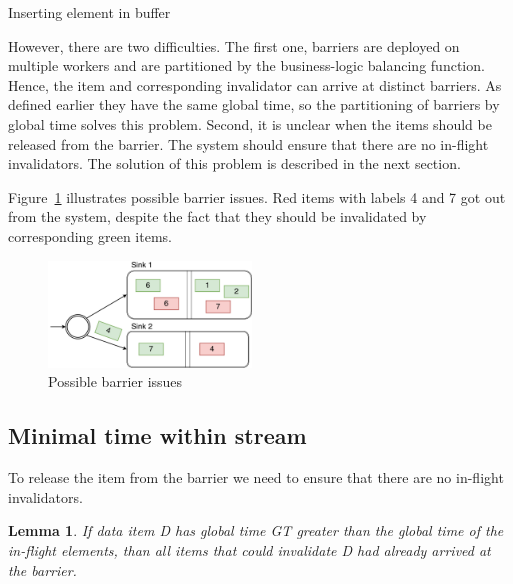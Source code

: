 \begin{algorithm}
\caption{Inserting element in buffer}
\label{buffer-insert}
\begin{algorithmic}
        \State {}
      \EndIf
    \EndFor
    \State {}
  \EndFunction
\end{algorithmic}
\end{algorithm}

However, there are two difficulties. The first one, barriers are deployed on multiple workers and are partitioned by the business-logic balancing function. Hence, the item and corresponding invalidator can arrive at distinct barriers. As defined earlier they have the same global time, so the partitioning of barriers by global time solves this problem. Second, it is unclear when the items should be released from the barrier. The system should ensure that there are no in-flight invalidators. The solution of this problem is described in the next section. 

Figure~\ref{invalidation-problems-figure} illustrates possible barrier issues. Red items with labels 4 and 7 got out from the system, despite the fact that they should be invalidated by corresponding green items. 

\begin{figure}[htbp]
  \centering
  \includegraphics[width=0.48\textwidth]{pics/invalidation_problems}
  \caption{Possible barrier issues}
  \label {invalidation-problems-figure}
\end{figure}

\subsection{Minimal time within stream}

To release the item from the barrier we need to ensure that there are no in-flight invalidators. 

\newtheorem{minimal-time-claim}{Lemma}

\begin{minimal-time-claim}
  If data item {\it D} has global time {\it GT} greater than the global time of the in-flight elements, than all items that could invalidate {\it D} had already arrived at the barrier.
\end{minimal-time-claim}

